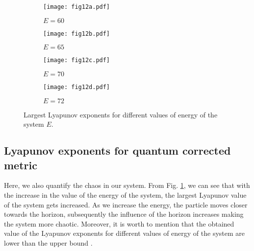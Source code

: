 \documentclass[aps,prd,showpacs,nofootinbib,floats,floatfix,preprintnumbers,groupedaddress,twocolumn]{revtex4-1}
\begin{document}
\begin{figure}[hb!]
	\centering
	\begin{subfigure}[b]{0.6\linewidth}
		\texttt{[image: fig12a.pdf]} \caption{$E=60$}
	\end{subfigure}
	\begin{subfigure}[b]{0.6\linewidth}
		\texttt{[image: fig12b.pdf]} \caption{$E=65$}
	\end{subfigure}
	\begin{subfigure}[b]{0.6\linewidth}
		\texttt{[image: fig12c.pdf]} \caption{$E=70$}
	\end{subfigure}
	\begin{subfigure}[b]{0.6\linewidth}
		\texttt{[image: fig12d.pdf]} \caption{$E=72$}
	\end{subfigure}
	\caption{Largest Lyapunov exponents for different values of energy of the system $E$.}
	\label{fig:12}
\end{figure} 	 
%
%
%
%
%
%
\subsection{Lyapunov exponents for quantum corrected metric}
%
%
%
%
\par\noindent
Here, we also quantify the chaos in our system. From Fig. \ref{fig:12}, we can see that with the increase in the value of the energy of the system, the largest Lyapunov value of the system gets increased. As we increase the energy, the particle moves closer towards the horizon, subsequently  the influence of the horizon increases making   the system more chaotic. Moreover, it is worth to mention that the obtained value of the Lyapunov exponents for different values of energy of the system are lower than the upper bound \cite{Maldacena:2015waa}.  
\end{document}
